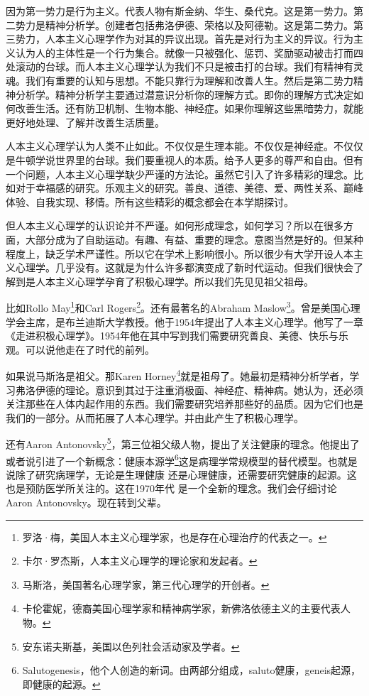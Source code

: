 因为第一势力是行为主义。代表人物有斯金纳、华生、桑代克。这是第一势力。第二势力是精神分析学。创建者包括弗洛伊德、荣格以及阿德勒。这是第二势力。第三势力，人本主义心理学作为对其的异议出现。首先是对行为主义的异议。行为主义认为人的主体性是一个行为集合。就像一只被强化、惩罚、奖励驱动被击打而四处滚动的台球。而人本主义心理学认为我们不只是被击打的台球。我们有精神有灵魂。我们有重要的认知与思想。不能只靠行为理解和改善人生。然后是第二势力精神分析学。精神分析学主要通过潜意识分析你的理解方式。即你的理解方式决定如何改善生活。还有防卫机制、生物本能、神经症。如果你理解这些黑暗势力，就能更好地处理、了解并改善生活质量。

人本主义心理学认为人类不止如此。不仅仅是生理本能。不仅仅是神经症。不仅仅是牛顿学说世界里的台球。我们要重视人的本质。给予人更多的尊严和自由。但有一个问题，人本主义心理学缺少严谨的方法论。虽然它引入了许多精彩的理念。比如对于幸福感的研究。乐观主义的研究。善良、道德、美德、爱、两性关系、巅峰体验、自我实现、移情。所有这些精彩的概念都会在本学期探讨。

但人本主义心理学的认识论并不严谨。如何形成理念，如何学习？所以在很多方面，大部分成为了自助运动。有趣、有益、重要的理念。意图当然是好的。但某种程度上，缺乏学术严谨性。所以它在学术上影响很小。所以很少有大学开设人本主义心理学。几乎没有。这就是为什么许多都演变成了新时代运动。但我们很快会了解到是人本主义心理学孕育了积极心理学。所以我们先见见祖父祖母。

比如Rollo May\footnote{罗洛·梅，美国人本主义心理学家，也是存在心理治疗的代表之一。}和Carl Rogers\footnote{卡尔·罗杰斯，人本主义心理学的理论家和发起者。}。还有最著名的Abraham Maslow\footnote{马斯洛，美国著名心理学家，第三代心理学的开创者。}。曾是美国心理学会主席，是布兰迪斯大学教授。他于1954年提出了人本主义心理学。他写了一章《走进积极心理学》。1954年他在其中写到我们需要研究善良、美德、快乐与乐观。可以说他走在了时代的前列。

如果说马斯洛是祖父。那Karen Horney\footnote{卡伦霍妮，德裔美国心理学家和精神病学家，新佛洛依德主义的主要代表人物。}就是祖母了。她最初是精神分析学者，学习弗洛伊德的理论。意识到其过于注重消极面、神经症、精神病。她认为，还必须关注那些在人体内起作用的东西。我们需要研究培养那些好的品质。因为它们也是我们的一部分。从而拓展了人本心理学。并由此产生了积极心理学。

还有Aaron Antonovsky\footnote{安东诺夫斯基，美国以色列社会活动家及学者。}，第三位祖父级人物，提出了关注健康的理念。他提出了或者说引进了一个新概念：健康本源学\footnote{Salutogenesis，他个人创造的新词。由两部分组成，saluto健康，geneis起源，即健康的起源。}这是病理学常规模型的替代模型。也就是说除了研究病理学，无论是生理健康 还是心理健康，还需要研究健康的起源。这也是预防医学所关注的。这在1970年代 是一个全新的理念。我们会仔细讨论Aaron Antonovsky。现在转到父辈。

